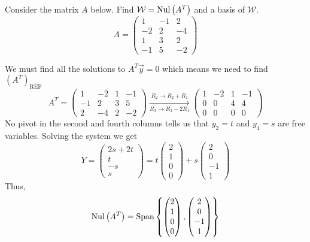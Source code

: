 \begin{example}{}{}
    Consider the matrix $A$ below. Find $\mathcal{W}=\text{Nul}\left(A^{T}\right)$ and a basis of $\mathcal{W}$.
    \[
        A = \begin{pmatrix}
            1 & -1 & 2 \\
            -2 & 2 & -4 \\
            1 & 3 & 2 \\
            -1 & 5 & -2
        \end{pmatrix} 
    \]

    \begin{solution}
        We must find all the solutions to $A^{T}\vec{y} = 0$ which means we need to find $\left(A^{T}\right)_{\text{REF}}$
        \[
            A^{T} = \begin{pmatrix}
                1 & -2 & 1 & -1 \\
                -1 & 2 & 3 & 5 \\
                2 & -4 & 2 & -2
            \end{pmatrix} 
            \xrightarrow[R_3 \to R_3 - 2R_1]{R_2 \to R_2 + R_1}
            \begin{pmatrix}
                1 & -2 & 1 & -1 \\
                0 & 0 & 4 & 4 \\
                0 & 0 & 0 & 0
            \end{pmatrix}
        \]
        No pivot in the second and fourth columns tells us that $y_2 = t$ and $y_4 = s$ are free variables. Solving the system we get 
        \[
            Y = \begin{pmatrix}
                2s + 2t \\ t \\ -s \\ s
            \end{pmatrix}
            =
            t \begin{pmatrix}
                2 \\ 1 \\ 0 \\ 0
            \end{pmatrix}
            + s\begin{pmatrix}
                2 \\ 0 \\ -1 \\ 1 
            \end{pmatrix}
        \]
        Thus,
        \[
            \text{Nul}\left(A^{T}\right) = \text{Span}\left\{
                \begin{pmatrix}
                    2 \\ 1 \\ 0 \\ 0 
                \end{pmatrix},
                \begin{pmatrix}
                    2 \\ 0 \\ -1 \\ 1
                \end{pmatrix}
             \right\}
        \]
    \end{solution}
\end{example}

